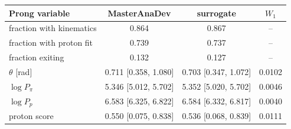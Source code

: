 \begin{tabular}{lccc}
\toprule
Prong variable & MasterAnaDev & surrogate & $W_1$ \\
\midrule
fraction with kinematics & 0.864 & 0.867 & -- \\
fraction with proton fit & 0.739 & 0.737 & -- \\
fraction exiting & 0.132 & 0.127 & -- \\
$\theta$ [rad] & 0.711 [0.358, 1.080] & 0.703 [0.347, 1.072] & 0.0102 \\
$\log P_\pi$ & 5.346 [5.012, 5.702] & 5.352 [5.020, 5.702] & 0.0046 \\
$\log P_p$ & 6.583 [6.325, 6.822] & 6.584 [6.332, 6.817] & 0.0040 \\
proton score & 0.550 [0.075, 0.838] & 0.536 [0.068, 0.839] & 0.0111 \\
\bottomrule
\end{tabular}
